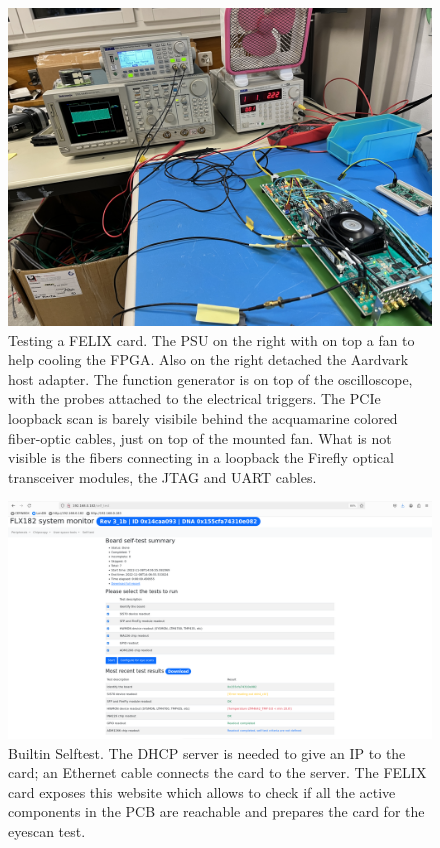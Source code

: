 \begin{figure}[H]
\centering
\includegraphics[width=\textwidth]{images/contributions/felix-card-testing.jpg}
\caption[Visual aid of FELIX card testing]{Testing a FELIX card. The PSU on the right with on top a fan to help cooling the \acs{FPGA}. Also on the right detached the Aardvark host adapter. The function generator is on top of the oscilloscope, with the probes attached to the electrical triggers. The \acs{PCIe} loopback scan is barely visibile behind the acquamarine colored fiber-optic cables, just on top of the mounted fan. What is not visible is the fibers connecting in a loopback the Firefly \protect\cite{firefly-optical-transceiver} optical transceiver modules, the JTAG and UART cables.}
\label{fig:felix-testing}
\end{figure}

\begin{figure}[H]
\centering
\includegraphics[width=\textwidth]{images/contributions/BIST.png}
\caption[Builtin Selftest screenshot]{Builtin Selftest. The DHCP server is needed to give an IP to the card; an Ethernet cable connects the card to the server. The \acs{FELIX} card exposes this website which allows to check if all the active components in the \acs{PCB} are reachable and prepares the card for the eyescan test.}
\label{fig:bist}
\end{figure}

